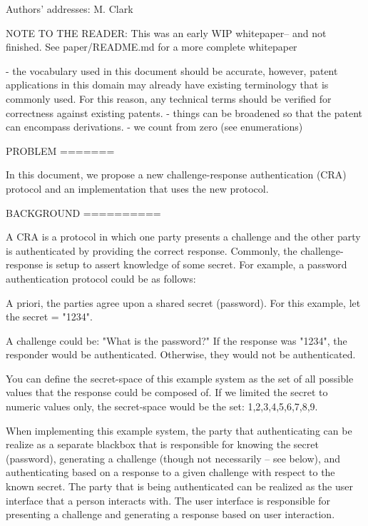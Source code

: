 \documentclass[12pt]{document}
\author{
MIKE CLARK\\
University of Calgary\\
}
\begin{document}
            
\begin{bottomstuff} 
Authors' addresses: 
M. Clark
\newline
\end{bottomstuff}
            
\maketitle


\begin{Introduction}
NOTE TO THE READER: 
This was an early WIP whitepaper-- and not finished. See paper/README.md for a more complete whitepaper

- the vocabulary used in this document should be accurate, however, patent applications in this domain may already have existing terminology that is commonly used. For this reason, any technical terms should be verified for correctness against existing patents.
- things can be broadened so that the patent can encompass derivations.
- we count from zero (see enumerations)

PROBLEM
=======

In this document, we propose a new challenge-response authentication (CRA) protocol and an implementation that uses the new protocol.

BACKGROUND
==========

A CRA is a protocol in which one party presents a challenge and the other party is authenticated by providing the correct response.
Commonly, the challenge-response is setup to assert knowledge of some secret.
For example, a password authentication protocol could be as follows:

A priori, the parties agree upon a shared secret (password). For this example, let the secret = "1234".

A challenge could be: "What is the password?"
If the response was "1234", the responder would be authenticated.
Otherwise, they would not be authenticated.

You can define the secret-space of this example system as the set of all possible values that the response could be composed of. If we limited the secret to numeric values only, the secret-space would be the set: {1,2,3,4,5,6,7,8,9}.


When implementing this example system, the party that authenticating can be realize as a separate blackbox that is responsible for knowing the secret (password), generating a challenge (though not necessarily -- see below), and authenticating based on a response to a given challenge with respect to the known secret. The party that is being authenticated can be realized as the user interface that a person interacts with. The user interface is responsible for presenting a challenge and generating a response based on user interaction.


\end{Introduction}
\end{document}
